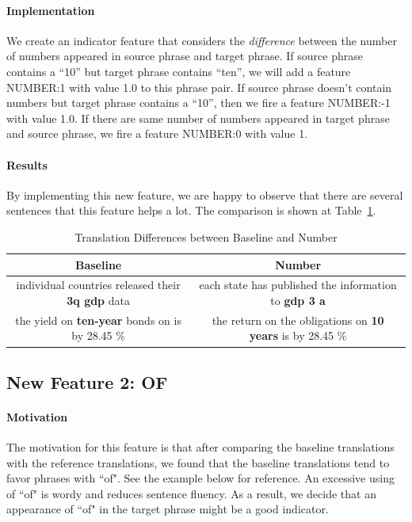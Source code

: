\documentclass{article}
\begin{document}
\paragraph{Implementation} We create an indicator feature that considers the \textit{difference} between the number of numbers appeared in source phrase and target phrase. If source phrase contains a ``10'' but target phrase contains ``ten'', we will add a feature \textsc{NUMBER:1} with value 1.0 to this phrase pair. If source phrase doesn't contain numbers but target phrase contains a ``10'', then we fire a feature \textsc{NUMBER:-1} with value 1.0. If there are same number of numbers appeared in target phrase and source phrase, we fire a feature \textsc{NUMBER:0} with value 1.

\paragraph{Results} By implementing this new feature, we are happy to observe that there are several sentences that this feature helps a lot. The comparison is shown at Table~\ref{tab:baselinevsnumber}.

\begin{table}[!htb]
\centering
\begin{tabular}{c|c}
\hline
 Baseline & Number \\
\hline
 individual countries released their \textbf{3q gdp} data  & each state has published the information to \textbf{gdp 3 a} \\
 the yield on \textbf{ten-year} bonds on is by 28.45 \% & the return on the obligations on \textbf{10 years} is by 28.45 \% \\
\hline
\end{tabular}
\caption{Translation Differences between Baseline and Number}
\label{tab:baselinevsnumber}
\end{table}

\subsection{New Feature 2: OF}

\paragraph{Motivation} The motivation for this feature is that after comparing the baseline translations with the reference translations, we found that the baseline translations tend to favor phrases with ``of". See the example below for reference. An excessive using of ``of" is wordy and reduces sentence fluency. As a result, we decide that an appearance of ``of" in the target phrase might be a good indicator.
\end{document}
